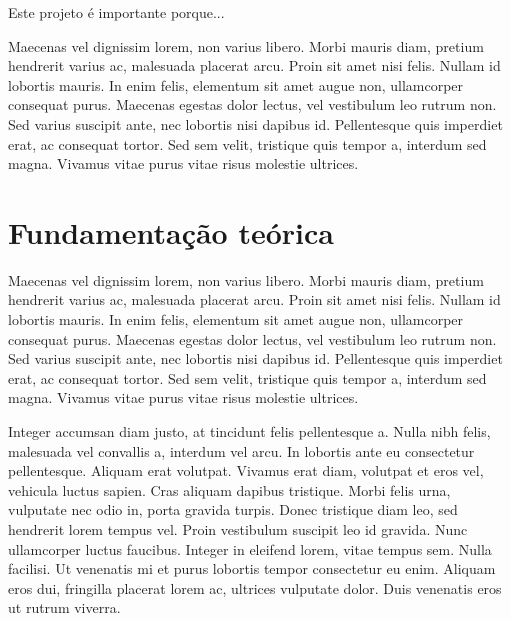 Este projeto é importante porque...

Maecenas vel dignissim lorem, non varius libero. Morbi mauris diam,
pretium hendrerit varius ac, malesuada placerat arcu. Proin sit amet
nisi felis. Nullam id lobortis mauris. In enim felis, elementum sit
amet augue non, ullamcorper consequat purus. Maecenas egestas dolor
lectus, vel vestibulum leo rutrum non. Sed varius suscipit ante, nec
lobortis nisi dapibus id. Pellentesque quis imperdiet erat, ac
consequat tortor. Sed sem velit, tristique quis tempor a, interdum sed
magna. Vivamus vitae purus vitae risus molestie ultrices.

\section{Fundamentação teórica}
\label{sec:fundamentacao}

Maecenas vel dignissim lorem, non varius libero. Morbi mauris diam,
pretium hendrerit varius ac, malesuada placerat arcu. Proin sit amet
nisi felis. Nullam id lobortis mauris. In enim felis, elementum sit
amet augue non, ullamcorper consequat purus. Maecenas egestas dolor
lectus, vel vestibulum leo rutrum non. Sed varius suscipit ante, nec
lobortis nisi dapibus id. Pellentesque quis imperdiet erat, ac
consequat tortor. Sed sem velit, tristique quis tempor a, interdum sed
magna. Vivamus vitae purus vitae risus molestie ultrices.

Integer accumsan diam justo, at tincidunt felis pellentesque a. Nulla
nibh felis, malesuada vel convallis a, interdum vel arcu. In lobortis
ante eu consectetur pellentesque. Aliquam erat volutpat. Vivamus erat
diam, volutpat et eros vel, vehicula luctus sapien. Cras aliquam
dapibus tristique. Morbi felis urna, vulputate nec odio in, porta
gravida turpis. Donec tristique diam leo, sed hendrerit lorem tempus
vel. Proin vestibulum suscipit leo id gravida. Nunc ullamcorper luctus
faucibus. Integer in eleifend lorem, vitae tempus sem. Nulla facilisi.
Ut venenatis mi et purus lobortis tempor consectetur eu enim. Aliquam
eros dui, fringilla placerat lorem ac, ultrices vulputate dolor. Duis
venenatis eros ut rutrum viverra.

